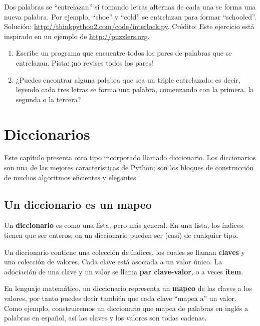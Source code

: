\documentclass[10pt]{book}
\begin{document}
\begin{exercise}

Dos palabras se ``entrelazan'' si tomando letras alternas de cada una se forma
una nueva palabra.  Por ejemplo, ``shoe'' y ``cold''
se entrelazan para formar ``schooled''.
Solución: \url{http://thinkpython2.com/code/interlock.py}.
Crédito: Este ejercicio está inspirado en un ejemplo de \url{http://puzzlers.org}.

\begin{enumerate}

\item Escribe un programa que encuentre todos los pares de palabras que se entrelazan.
  Pista: ¡no revises todos los pares!

\item ¿Puedes encontrar alguna palabra que sea un triple entrelazado; es decir,
  leyendo cada tres letras se forma una palabra, comenzando con la primera, la segunda o
  la tercera?

\end{enumerate}
\end{exercise}


\chapter{Diccionarios}

Este capítulo presenta otro tipo incorporado llamado diccionario.
Los diccionarios son una de las mejores características de Python; son los
bloques de construcción de muchos algoritmos eficientes y elegantes.


\section{Un diccionario es un mapeo}

Un {\bf diccionario} es como una lista, pero más general.  En una lista,
los índices tienen que ser enteros; en un diccionario pueden ser
(casi) de cualquier tipo.

Un diccionario contiene una colección de índices, los cuales se llaman {\bf
  claves} y una colección de valores.  Cada clave está asociada a un
valor único.  La adociación de una clave y un valor se llama {\bf
  par clave-valor}, o a veces {\bf ítem}.  

En lenguaje matemático, un diccionario representa un {\bf mapeo}
de las claves a los valores, por tanto puedes decir también que cada clave
``mapea a'' un valor.
Como ejemplo, construiremos un diccionario que mapea de palabras en inglés
a palabras en español, así las claves y los valores son todas cadenas.
\end{document}
